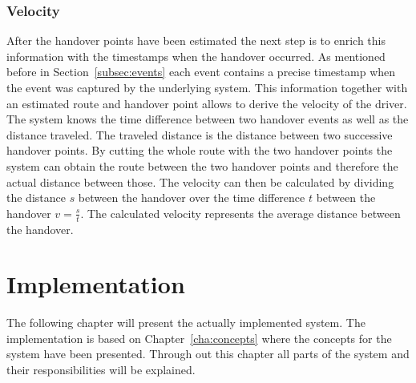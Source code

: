 \documentclass[master,english]{hgbthesis}
\begin{document}
\subsection{Velocity}
After the handover points have been estimated the next step is to enrich this information with the timestamps when the handover occurred. As mentioned before in Section~\ref{subsec:events} each event contains a precise timestamp when the event was captured by the underlying system. This information together with an estimated route and handover point allows to derive the velocity of the driver. The system knows the time difference between two handover events as well as the distance traveled. The traveled distance is the distance between two successive handover points. By cutting the whole route with the two handover points the system can obtain the route between the two handover points and therefore the actual distance between those. The velocity can then be calculated  by dividing the distance $s$ between the handover over the time difference $t$ between the handover $v=\frac{s}{t}$. The calculated velocity represents the average distance between the handover.%
\chapter{Implementation}
\label{cha:implementation}
The following chapter will present the actually implemented system. The implementation is based on Chapter~\ref{cha:concepts} where the concepts for the system have been presented. Through out this chapter all parts of the system and their responsibilities will be explained.  
\end{document}
